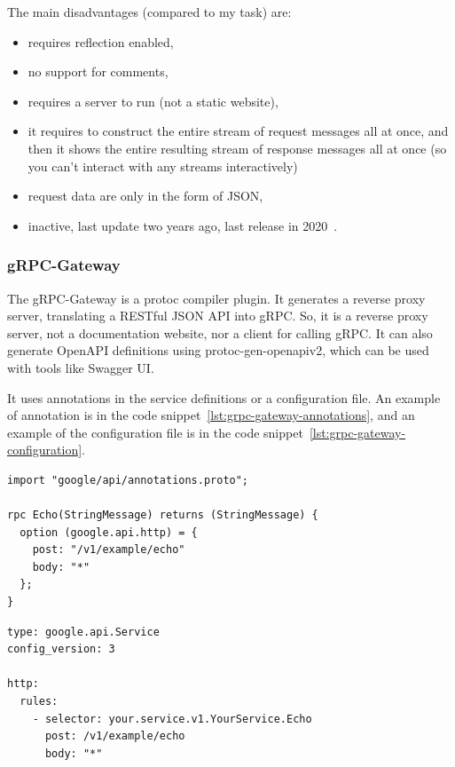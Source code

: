 The main disadvantages (compared to my task) are:
\begin{itemize}
    \item requires reflection enabled,
    \item no support for comments,
    \item requires a server to run (not a static website),
    \item it requires to construct the entire stream of request messages all at once, and then it shows the entire resulting stream of response messages all at once (so you can't interact with any streams interactively)
    \item request data are only in the form of JSON,
    \item inactive, last update two years ago, last release in 2020~\cite{grpc-swagger}.
\end{itemize}

\subsubsection{gRPC-Gateway}
The gRPC-Gateway is a protoc compiler plugin.
It generates a reverse proxy server, translating a RESTful JSON API into gRPC\@.
So, it is a reverse proxy server, not a documentation website, nor a client for calling gRPC\@.
It can also generate OpenAPI definitions using protoc-gen-openapiv2, which can be used with tools like Swagger UI\@.
\cite{grpc-letmegrpc}

It uses annotations in the service definitions or a configuration file.
An example of annotation is in the code snippet~\ref{lst:grpc-gateway-annotations},
and an example of the configuration file is in the code snippet~\ref{lst:grpc-gateway-configuration}.
\cite{grpc-letmegrpc}


\begin{lstlisting}[language=protobuf2, style=protobuf, caption={gRPC-Gateway Annotations~\cite{grpc-gateway}}, label={lst:grpc-gateway-annotations}]
import "google/api/annotations.proto";

rpc Echo(StringMessage) returns (StringMessage) {
  option (google.api.http) = {
    post: "/v1/example/echo"
    body: "*"
  };
}
\end{lstlisting}

\begin{lstlisting}[style=yaml, caption={gRPC-Gateway Configuration File~\cite{grpc-gateway}}, label={lst:grpc-gateway-configuration}]
type: google.api.Service
config_version: 3

http:
  rules:
    - selector: your.service.v1.YourService.Echo
      post: /v1/example/echo
      body: "*"
\end{lstlisting}

